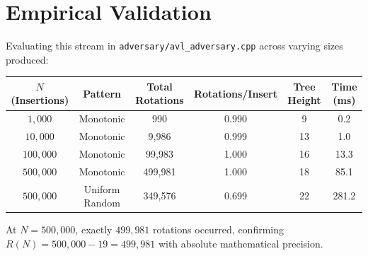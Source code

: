 \documentclass[11pt,a4paper]{article}
\begin{document}
\section{Empirical Validation}
Evaluating this stream in \texttt{adversary/avl\_adversary.cpp} across varying sizes produced:
\begin{center}
\begin{tabular}{|c|c|c|c|c|c|}
\hline
\textbf{$N$ (Insertions)} & \textbf{Pattern} & \textbf{Total Rotations} & \textbf{Rotations/Insert} & \textbf{Tree Height} & \textbf{Time (ms)} \\
\hline
$1{,}000$ & Monotonic & 990 & 0.990 & 9 & 0.2 \\
$10{,}000$ & Monotonic & 9,986 & 0.999 & 13 & 1.0 \\
$100{,}000$ & Monotonic & 99,983 & 1.000 & 16 & 13.3 \\
$500{,}000$ & Monotonic & 499,981 & 1.000 & 18 & 85.1 \\
$500{,}000$ & Uniform Random & 349,576 & 0.699 & 22 & 281.2 \\
\hline
\end{tabular}
\end{center}

At $N = 500{,}000$, exactly $499{,}981$ rotations occurred, confirming $R(N) = 500{,}000 - 19 = 499{,}981$ with absolute mathematical precision.
\end{document}
